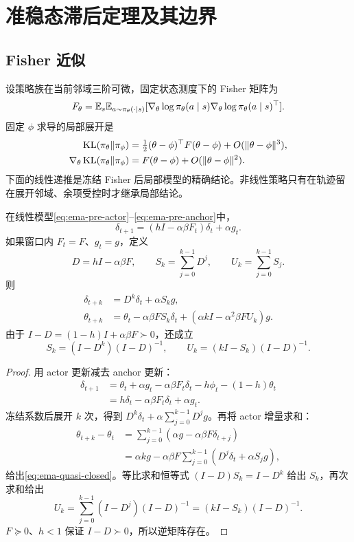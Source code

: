 \section{准稳态滞后定理及其边界}

\subsection{Fisher 近似}

设策略族在当前邻域三阶可微，固定状态测度下的 Fisher 矩阵为
\[
 F_\theta=\mathbb{E}_s\mathbb{E}_{a\sim\pi_\theta(\cdot\mid s)}
 [\nabla_\theta\log\pi_\theta(a\mid s)
  \nabla_\theta\log\pi_\theta(a\mid s)^\top].
\]
固定 $\phi$ 求导的局部展开是
\begin{align}
 \operatorname{KL}(\pi_\theta\Vert\pi_\phi)
 &=\tfrac12(\theta-\phi)^\top F(\theta-\phi)
   +O(\|\theta-\phi\|^3),\\
 \nabla_\theta\operatorname{KL}(\pi_\theta\Vert\pi_\phi)
 &=F(\theta-\phi)+O(\|\theta-\phi\|^2).
\end{align}
下面的线性递推是冻结 Fisher 后局部模型的精确结论。非线性策略只有在轨迹留在展开邻域、余项受控时才继承局部结论。

\begin{theorem}
\label{thm:ema-lag}
在线性模型\eqref{eq:ema-pre-actor}--\eqref{eq:ema-pre-anchor}中，
\[
 \delta_{t+1}=(hI-\alpha\beta F_t)\delta_t+\alpha g_t.
\]
如果窗口内 $F_t=F$、$g_t=g$，定义
\[
 D=hI-\alpha\beta F,\qquad
 S_k=\sum_{j=0}^{k-1}D^j,\qquad U_k=\sum_{j=0}^{k-1}S_j.
\]
则
\begin{align}
 \delta_{t+k}&=D^k\delta_t+\alpha S_kg,\\
 \theta_{t+k}&=\theta_t-\alpha\beta FS_k\delta_t
       +(\alpha kI-\alpha^2\beta FU_k)g.
 \label{eq:ema-quasi-closed}
\end{align}
由于 $I-D=(1-h)I+\alpha\beta F\succ0$，还成立
\[
 S_k=(I-D^k)(I-D)^{-1},\qquad
 U_k=(kI-S_k)(I-D)^{-1}.
\]
\end{theorem}
\begin{proof}
用 actor 更新减去 anchor 更新：
\begin{align*}
 \delta_{t+1}
 &=\theta_t+\alpha g_t-\alpha\beta F_t\delta_t
   -h\phi_t-(1-h)\theta_t\\
 &=h\delta_t-\alpha\beta F_t\delta_t+\alpha g_t.
\end{align*}
冻结系数后展开 $k$ 次，得到 $D^k\delta_t+\alpha\sum_{j=0}^{k-1}D^jg$。再将 actor 增量求和：
\begin{align*}
 \theta_{t+k}-\theta_t
 &=\sum_{j=0}^{k-1}(\alpha g-\alpha\beta F\delta_{t+j})\\
 &=\alpha kg-\alpha\beta F\sum_{j=0}^{k-1}
   (D^j\delta_t+\alpha S_jg),
\end{align*}
给出\eqref{eq:ema-quasi-closed}。等比求和恒等式 $(I-D)S_k=I-D^k$ 给出 $S_k$，再次求和给出
\[
 U_k=\sum_{j=0}^{k-1}(I-D^j)(I-D)^{-1}
     =(kI-S_k)(I-D)^{-1}.
\]
$F\succeq0$、$h<1$ 保证 $I-D\succ0$，所以逆矩阵存在。
\end{proof}

